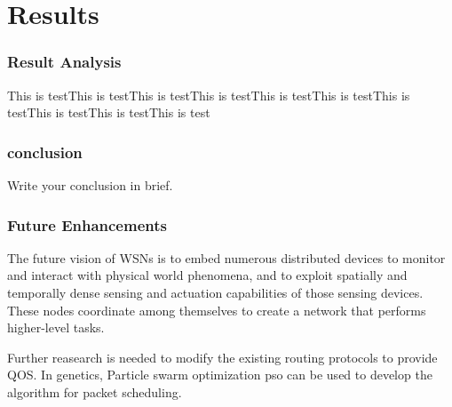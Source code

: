 \chapter{Results}
\subsection{Result Analysis}
This is testThis is testThis is testThis is testThis is testThis is testThis is testThis is testThis is testThis is test

\subsection{conclusion}

Write your conclusion in brief. 

\subsection{Future Enhancements}
\par The future vision of WSNs is to embed numerous distributed devices to monitor and interact with physical world phenomena, and to exploit spatially and temporally dense sensing and actuation capabilities of those sensing devices. These nodes coordinate among themselves to create a network that performs higher-level tasks.
\par Further reasearch is needed to modify the existing routing protocols to provide QOS. In genetics, Particle swarm optimization \gls {pso} can be used to develop the algorithm for packet scheduling.





